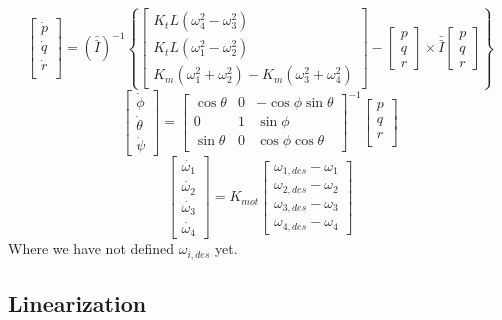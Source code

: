 \documentclass{article}
\numberwithin{equation}{section}
\newcommand{\omegaVec}{
\left[ \begin{array}{ccc}
p\\
q\\
r \end{array} \right]
}
\begin{document}
\begin{equation}
\label{angAccelStateStep}
\left[\begin{array}{c}\dot{p}\\
			       \dot{q}\\
			       \dot{r} \\ \end{array} \right]
			       =
 	 \left(\bar{\bar{I}}\right)^{-1}\left\{
	  \left[ \begin{array}{ccc} K_{t}L\left(\omega_4^2 - \omega_3^2\right) \\ 
  				      K_{t}L\left(\omega_1^2 - \omega_2^2\right) \\ 
				      K_{m}\left(\omega_1^2 + \omega_2^2\right) - K_{m}\left(\omega_3^2 +\omega_4^2\right) \end{array} \right]
				      -
				      \omegaVec \times \bar{\bar{I}} \omegaVec \right\}
\end{equation}
\begin{equation}
\label{eulerDotStateStep}
\left[\begin{array}{c}\dot{\phi}\\
				\dot{\theta} \\
				\dot{\psi} \end{array} \right]
				=
		\left[ \begin{array}{ccc} \cos{\theta} & 0 & -\cos{\phi}\sin{\theta} \\
						     0 & 1 & \sin{\phi} \\
						     \sin{\theta} & 0 & \cos{\phi}\cos{\theta} \end{array} \right]^{-1}
		\left[\begin{array}{c}p\\
			       q\\
			       r \\ \end{array} \right]
\end{equation}
\begin{equation}
\label{omegaDotStateStep}
\left[\begin{array}{c} \dot{\omega_1} \\
				\dot{\omega_2} \\
				\dot{\omega_3} \\
				\dot{\omega_4} \end{array} \right]
				=
	K_{mot}\left[\begin{array}{c} \omega_{1,des} - \omega_1 \\
						   \omega_{2,des} - \omega_2 \\
						   \omega_{3,des} - \omega_3 \\
						   \omega_{4,des} - \omega_4 \end{array} \right]
\end{equation}
Where we have not defined $\omega_{i,des}$ yet.

\subsection{Linearization}
\end{document}
